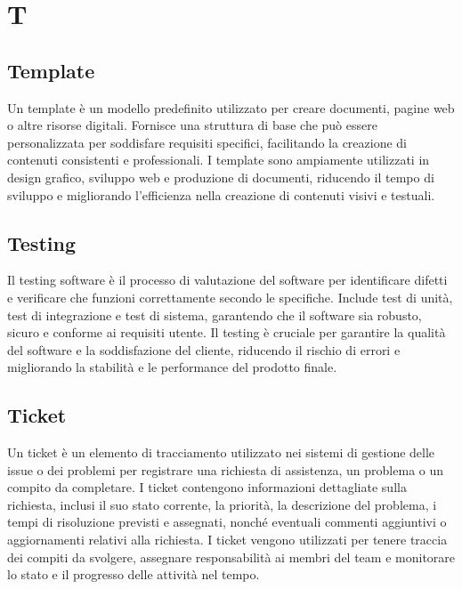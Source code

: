 \section{T}

\vspace{2em}
\subsection*{Template}
\par Un template è un modello predefinito utilizzato per creare documenti, pagine web o altre risorse digitali. Fornisce una struttura di base che può essere personalizzata per soddisfare requisiti specifici, facilitando la creazione di contenuti consistenti e professionali. I template sono ampiamente utilizzati in design grafico, sviluppo web e produzione di documenti, riducendo il tempo di sviluppo e migliorando l'efficienza nella creazione di contenuti visivi e testuali.

\vspace{2em}
\subsection*{Testing}
\par Il testing software è il processo di valutazione del software per identificare difetti e verificare che funzioni correttamente secondo le specifiche. Include test di unità, test di integrazione e test di sistema, garantendo che il software sia robusto, sicuro e conforme ai requisiti utente. Il testing è cruciale per garantire la qualità del software e la soddisfazione del cliente, riducendo il rischio di errori e migliorando la stabilità e le performance del prodotto finale.

\vspace{2em}
\subsection*{Ticket}
\par Un ticket è un elemento di tracciamento utilizzato nei sistemi di gestione delle issue o dei problemi per registrare una richiesta di assistenza, un problema o un compito da completare. I ticket contengono informazioni dettagliate sulla richiesta, inclusi il suo stato corrente, la priorità, la descrizione del problema, i tempi di risoluzione previsti e assegnati, nonché eventuali commenti aggiuntivi o aggiornamenti relativi alla richiesta. I ticket vengono utilizzati per tenere traccia dei compiti da svolgere, assegnare responsabilità ai membri del team e monitorare lo stato e il progresso delle attività nel tempo.

